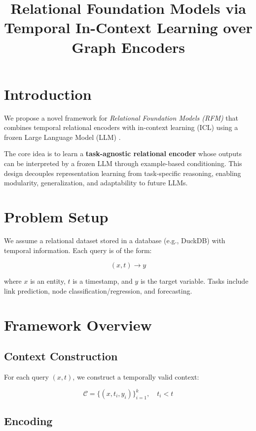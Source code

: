 \documentclass[11pt]{article}
\title{\textbf{Relational Foundation Models via Temporal In-Context Learning over Graph Encoders}}
\author{}
\date{}
\begin{document}
\maketitle

\section{Introduction}

We propose a novel framework for \textit{Relational Foundation Models (RFM)} that combines temporal relational encoders with in-context learning (ICL) using a frozen Large Language Model (LLM) \cite{dummy-rfm-note}. 

The core idea is to learn a \textbf{task-agnostic relational encoder} whose outputs can be interpreted by a frozen LLM through example-based conditioning. This design decouples representation learning from task-specific reasoning, enabling modularity, generalization, and adaptability to future LLMs.

\section{Problem Setup}

We assume a relational dataset stored in a database (e.g., DuckDB) with temporal information. Each query is of the form:

\begin{equation}
(x, t) \rightarrow y
\end{equation}

where $x$ is an entity, $t$ is a timestamp, and $y$ is the target variable. Tasks include link prediction, node classification/regression, and forecasting.

\section{Framework Overview}

\subsection{Context Construction}

For each query $(x,t)$, we construct a temporally valid context:

\begin{equation}
\mathcal{C} = \{(x, t_i, y_i)\}_{i=1}^{k}, \quad t_i < t
\end{equation}

\subsection{Encoding}
\end{document}
